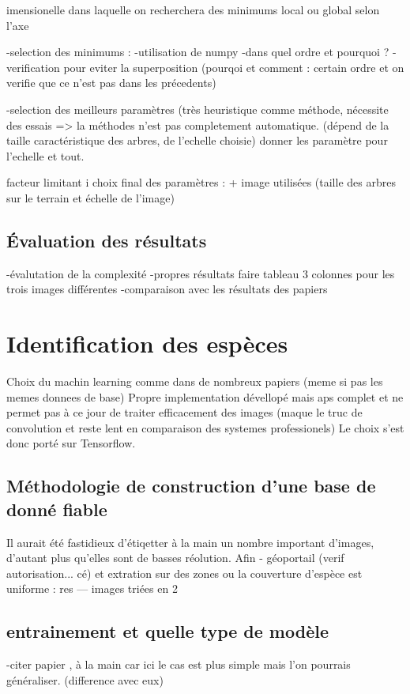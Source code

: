 \documentclass{article}
\begin{document}
	imensionelle dans laquelle on recherchera des minimums local ou global selon l'axe
		
		-selection des minimums :
			-utilisation de numpy
			-dans quel ordre et pourquoi ?
			-verification pour eviter la superposition (pourqoi et comment : certain ordre et on verifie que ce n'est pas dans les précedents)
	
		-selection des meilleurs paramètres (très heuristique comme méthode, nécessite des essais => la méthodes n'est pas completement automatique. (dépend de la taille caractéristique des arbres, de l'echelle choisie) donner les paramètre pour l'echelle et tout.

		facteur limitant i
		choix final des paramètres : + image utilisées (taille des arbres sur le terrain et échelle de l'image) 

	\subsection{\'{E}valuation des résultats}
		-évalutation de la complexité 
		-propres résultats
		faire tableau 3 colonnes pour les trois images différentes
		-comparaison avec les résultats des papiers 

\section{Identification des espèces}

	Choix du machin learning comme dans de nombreux papiers (meme si pas les memes donnees de base) Propre implementation dévellopé mais aps complet et ne permet pas à ce jour de traiter efficacement des images (maque le truc de convolution et reste lent en comparaison des systemes professionels) Le choix s'est donc porté sur Tensorflow.  

	\subsection{Méthodologie de construction d'une base de donné fiable}
		Il aurait été fastidieux d'étiqetter à la main un nombre important d'images, d'autant plus qu'elles sont de basses réolution. Afin   
		- géoportail (verif autorisation... cé) et extration sur des zones ou la couverture d'espèce est uniforme : res --- images triées en 2
	
	\subsection{entrainement et quelle type de modèle }
		-citer papier , à la main car ici le cas est plus simple mais l'on pourrais généraliser. (difference avec eux)
\end{document}
